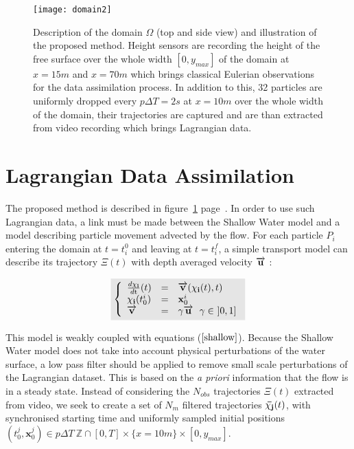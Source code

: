 \clearpage

\begin{figure}[H]
   \texttt{[image: domain2]}
   \caption{\label{domain} 
       Description of the domain $\Omega$ (top and side view) and illustration of the proposed method.
       Height sensors are recording the height of the free surface over the whole width $[0,y_{max}]$ of the domain at $x=15m$ and $x=70m$ which brings classical Eulerian observations for the data assimilation process.
       In addition to this, 32 particles are uniformly dropped every $p \Delta T = 2s$ at $x=10m$ over the whole width of the domain, their trajectories are captured and are than extracted from video recording which brings Lagrangian data.
}
\end{figure}

\section{Lagrangian Data Assimilation}

The proposed method is described in figure~\ref{domain} page~\pageref{domain}.
In order to use such Lagrangian data,
a link must be made between the Shallow Water model and a model describing particle movement advected by the flow.
For each particle $P_i$ entering the domain at $t=t_i^0$ and leaving at $t=t_i^f$,
a simple transport model can describe its trajectory $\Xi(t)$ with depth averaged velocity $\overrightarrow{\mathbf{u}}$ :

$$
\begin{equation}
\colbox{
\label{transport}
\left\{
\begin{array}{l c l}
    \fd{\Xi}{t}(t) &=& \v(\Xi(t), t) \\
    \Xi(t_0^i) &=& \mathbf{x}_0^i \\
    \v &=& \gamma \u\ \ \gamma \in\ ]0,1]
\end{array}
\right.
}
\end{equation}
$$

This model is weakly coupled with equations ($\ref{shallow}$).
Because the Shallow Water model does not take into account physical perturbations of the water surface,
a low pass filter should be applied to remove small scale perturbations of the Lagrangian dataset.
This is based on the \textit{a priori} information that the flow is in a steady state.
Instead of considering the $N_{obs}$ trajectories $\Xi(t)$ extracted from video,
we seek to create a set of $N_m$ filtered trajectories $\mathbf{\bar{\chi_j}}(t)$,  
with synchronised starting time and uniformly sampled initial positions $(t^j_0, \mathbf{x}^j_0) \in p\Delta T\ \mathbb{Z} \cap [0,T] \times \{x=10m\} \times [0,y_{max}]$. 

